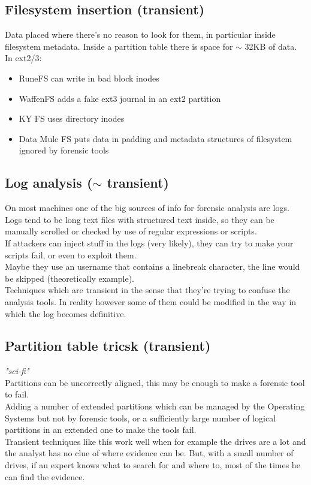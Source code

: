     \subsection{Filesystem insertion (transient)}
        Data placed where there's no reason to look for them, in particular inside filesystem metadata. Inside a partition table there is space for $\sim$ 32KB of data.\\
        In ext2/3:
        \begin{itemize}
            \item RuneFS can write in bad block inodes
            \item WaffenFS adds a fake ext3 journal in an ext2 partition
            \item KY FS uses directory inodes
            \item Data Mule FS puts data in padding and metadata structures of filesystem ignored by forensic tools
        \end{itemize}
    \subsection{Log analysis ($\sim$ transient)}
        On most machines one of the big sources of info for forensic analysis are logs.\\ 
        Logs tend to be long text files with structured text inside, so they can be manually scrolled or checked by use of regular expressions or scripts.\\
        If attackers can inject stuff in the logs (very likely), they can try to make your scripts fail, or even to exploit them.\\
        Maybe they use an username that contains a linebreak character, the line would be skipped (theoretically example).\\
        Techniques which are transient in the sense that they're trying to confuse the analysis tools. In reality however some of them could be modified in the way in which the log becomes definitive.
    \subsection{Partition table tricsk (transient)}
        \textit{"sci-fi"}\\
        Partitions can be uncorrectly aligned, this may be enough to make a forensic tool to fail. \\
        Adding a number of extended partitions which can be managed by the Operating Systems but not by forensic tools, or a sufficiently large number of logical partitions in an extended one to make the tools fail.\\
        Transient techniques like this work well when for example the drives are a lot and the analyst has no clue of where evidence can be. But, with a small number of drives, if an expert knows what to search for and where to, most of the times he can find the evidence.

